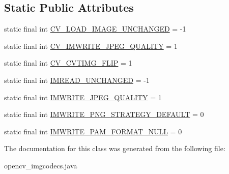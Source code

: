\subsection*{Static Public Attributes}
\begin{DoxyCompactItemize}
\item 
static final int \hyperlink{group__imgcodecs__c_ga98f1d87118e743ffeec57c7f3a10afd6}{C\+V\+\_\+\+L\+O\+A\+D\+\_\+\+I\+M\+A\+G\+E\+\_\+\+U\+N\+C\+H\+A\+N\+G\+ED} = -\/1
\item 
static final int \hyperlink{group__imgcodecs__c_ga6359737e32478705e367f06a0a4d14b1}{C\+V\+\_\+\+I\+M\+W\+R\+I\+T\+E\+\_\+\+J\+P\+E\+G\+\_\+\+Q\+U\+A\+L\+I\+TY} = 1
\item 
static final int \hyperlink{group__imgcodecs__c_ga9e58aa60c2a368479b56debeae227525}{C\+V\+\_\+\+C\+V\+T\+I\+M\+G\+\_\+\+F\+L\+IP} = 1
\item 
static final int \hyperlink{group__imgcodecs_gaba8d68ffadfa415aec1a51ee480143a7}{I\+M\+R\+E\+A\+D\+\_\+\+U\+N\+C\+H\+A\+N\+G\+ED} = -\/1
\item 
static final int \hyperlink{group__imgcodecs_gacc5cde2ea5764c3a523832a3d5c6c7e4}{I\+M\+W\+R\+I\+T\+E\+\_\+\+J\+P\+E\+G\+\_\+\+Q\+U\+A\+L\+I\+TY} = 1
\item 
static final int \hyperlink{group__imgcodecs_gabb28172fadcb5118b62c1e96ce65d7bd}{I\+M\+W\+R\+I\+T\+E\+\_\+\+P\+N\+G\+\_\+\+S\+T\+R\+A\+T\+E\+G\+Y\+\_\+\+D\+E\+F\+A\+U\+LT} = 0
\item 
static final int \hyperlink{group__imgcodecs_ga90aabdcbe963846b2645af3285b410b8}{I\+M\+W\+R\+I\+T\+E\+\_\+\+P\+A\+M\+\_\+\+F\+O\+R\+M\+A\+T\+\_\+\+N\+U\+LL} = 0
\end{DoxyCompactItemize}


The documentation for this class was generated from the following file\+:\begin{DoxyCompactItemize}
\item 
opencv\+\_\+imgcodecs.\+java\end{DoxyCompactItemize}
